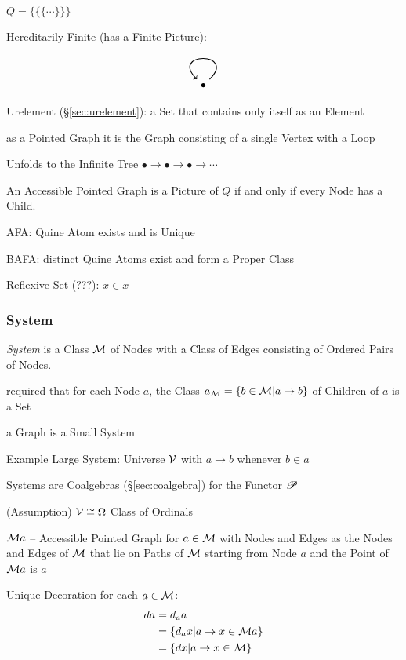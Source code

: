 $Q = \{\{\{\cdots\}\}\}$

Hereditarily Finite (has a Finite Picture):
\[
  \begin{tikzpicture}
    \node (A) {$\bullet$};
    \draw[->,thick,loop] (A) to (A);
  \end{tikzpicture}
\]

Urelement (\S\ref{sec:urelement}): a Set that contains only itself as
an Element

as a Pointed Graph it is the Graph consisting of a single Vertex with
a Loop

Unfolds to the Infinite Tree $\bullet \rightarrow \bullet
\rightarrow \bullet \rightarrow \cdots$

An Accessible Pointed Graph is a Picture of $Q$ if and only if every
Node has a Child. \cite{aczel88}

AFA: Quine Atom exists and is Unique

BAFA: distinct Quine Atoms exist and form a Proper Class

Reflexive Set (???): $x \in x$



\subsubsection{System}\label{sec:system}
\cite{aczel88}

\emph{System} is a Class $\mathcal{M}$ of Nodes with a Class of Edges
consisting of Ordered Pairs of Nodes.

required that for each Node $a$, the Class $a_\mathcal{M} = \{b \in
\mathcal{M} | a \rightarrow b\}$ of Children of $a$ is a Set

a Graph is a Small System

Example Large System: Universe $\mathcal{V}$ with $a \rightarrow b$
whenever $b \in a$

Systems are Coalgebras (\S\ref{sec:coalgebra}) for the Functor $\mathscr{P}$

(Assumption) $\mathcal{V} \cong \Omega$ Class of Ordinals

$\mathcal{M} a$ -- Accessible Pointed Graph for $a \in \mathcal{M}$ with
Nodes and Edges as the Nodes and Edges of $\mathcal{M}$ that lie on
Paths of $\mathcal{M}$ starting from Node $a$ and the Point of
$\mathcal{M} a$ is $a$

Unique Decoration for each $a \in \mathcal{M}$:
\begin{align*}
  d a &= d_a a \\
      &= \{d_a x | a \rightarrow x \in \mathcal{M} a\} \\
      &= \{d x | a \rightarrow x \in \mathcal{M}\}
\end{align*}

